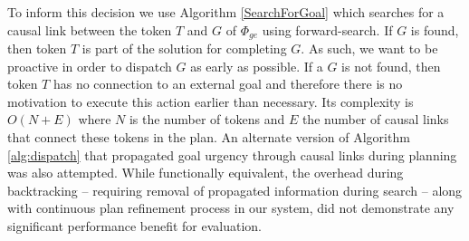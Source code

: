 To inform this decision we use Algorithm \ref{SearchForGoal} which
searches for a causal link between the token $T$ and $G$ of
$\Phi_{ge}$ using forward-search. If $G$ is found, then token $T$ is
part of the solution for completing $G$. As such, we want to be
proactive in order to dispatch $G$ as early as possible. If a $G$ is
not found, then token $T$ has no connection to an external goal and
therefore there is no motivation to execute this action earlier than
necessary. Its complexity is $O(N+E)$ \cite{corman} where $N$ is the
number of tokens and $E$ the number of causal links that connect these
tokens in the plan. An alternate version of Algorithm
\ref{alg:dispatch} that propagated goal urgency through causal links
during planning was also attempted. While functionally equivalent, the
overhead during backtracking -- requiring removal of propagated
information during search -- along with continuous plan refinement
process in our system, did not demonstrate any significant performance
benefit for evaluation.



